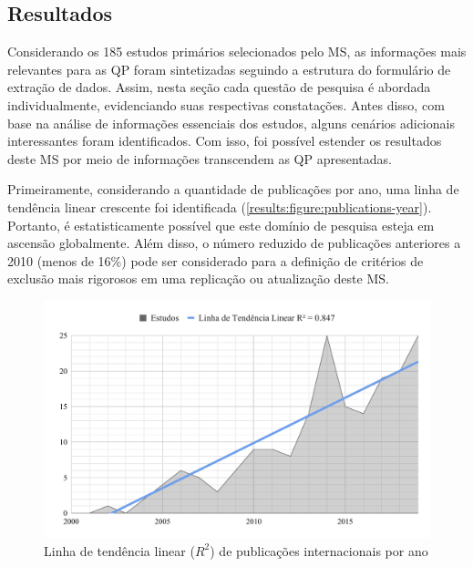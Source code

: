 \subsection{Resultados}
\label{ms:resultados}

Considerando os 185 estudos primários selecionados pelo MS, as informações mais relevantes para as QP foram sintetizadas seguindo a estrutura do formulário de extração de dados. Assim, nesta seção cada questão de pesquisa é abordada individualmente, evidenciando suas respectivas constatações. Antes disso, com base na análise de informações essenciais dos estudos, alguns cenários adicionais interessantes foram identificados. Com isso, foi possível estender os resultados deste MS por meio de informações transcendem as QP apresentadas.

Primeiramente, considerando a quantidade de publicações por ano, uma linha de tendência linear crescente foi identificada (\autoref{results:figure:publications-year}). Portanto, é estatisticamente possível que este domínio de pesquisa esteja em ascensão globalmente. Além disso, o número reduzido de publicações anteriores a 2010 (menos de 16\%) pode ser considerado para a definição de critérios de exclusão mais rigorosos em uma replicação ou atualização deste MS.

\begin{figure}[htbp]
\caption{Linha de tendência linear ($R^2$) de publicações internacionais por ano}
\label{results:figure:publications-year}
\centerline{\includegraphics[width=\columnwidth]{images/publications-sm-timeline.pdf}}
\fautor
\end{figure}


